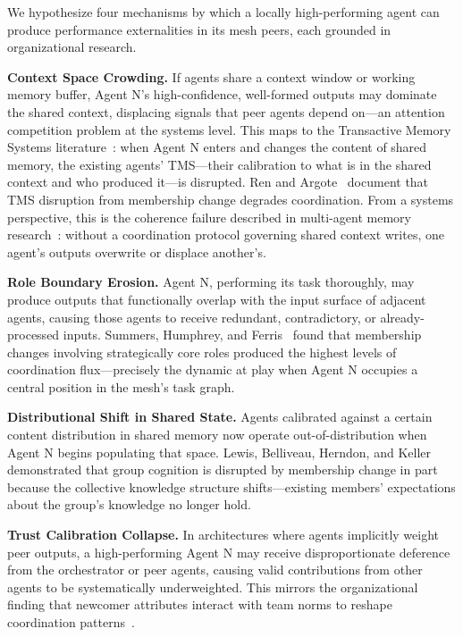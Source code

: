 We hypothesize four mechanisms by which a locally high-performing agent can
produce performance externalities in its mesh peers, each grounded in
organizational research.

\textbf{Context Space Crowding.} If agents share a context window or working
memory buffer, Agent N's high-confidence, well-formed outputs may dominate the
shared context, displacing signals that peer agents depend on---an attention
competition problem at the systems level. This maps to the Transactive Memory
Systems literature~\cite{wegner1987transactive,lewis2007group,ren2011transactive}:
when Agent N enters and changes the content of shared memory, the existing
agents' TMS---their calibration to what is in the shared context and who
produced it---is disrupted. Ren and Argote~\cite{ren2011transactive} document
that TMS disruption from membership change degrades coordination. From a systems
perspective, this is the coherence failure described in multi-agent memory
research~\cite{fu2026memory}: without a coordination protocol governing shared
context writes, one agent's outputs overwrite or displace another's.

\textbf{Role Boundary Erosion.} Agent N, performing its task thoroughly, may
produce outputs that functionally overlap with the input surface of adjacent
agents, causing those agents to receive redundant, contradictory, or
already-processed inputs. Summers, Humphrey, and Ferris~\cite{summers2012team}
found that membership changes involving strategically core roles produced the
highest levels of coordination flux---precisely the dynamic at play when Agent
N occupies a central position in the mesh's task graph.

\textbf{Distributional Shift in Shared State.} Agents calibrated against a
certain content distribution in shared memory now operate out-of-distribution
when Agent N begins populating that space. Lewis, Belliveau, Herndon, and
Keller~\cite{lewis2007group} demonstrated that group cognition is disrupted by
membership change in part because the collective knowledge structure
shifts---existing members' expectations about the group's knowledge no longer
hold.

\textbf{Trust Calibration Collapse.} In architectures where agents implicitly
weight peer outputs, a high-performing Agent N may receive disproportionate
deference from the orchestrator or peer agents, causing valid contributions
from other agents to be systematically underweighted. This mirrors the
organizational finding that newcomer attributes interact with team norms to
reshape coordination patterns~\cite{trainer2020membership}.

